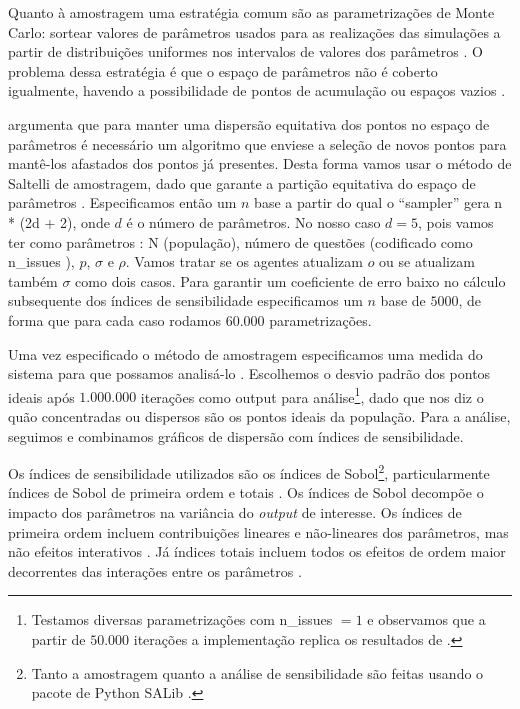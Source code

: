 Quanto à amostragem uma estratégia comum são as parametrizações de Monte Carlo:
sortear valores de parâmetros usados para as realizações das simulações a partir
de distribuições uniformes nos intervalos de valores dos parâmetros
\cite{laver2011party}. O problema dessa estratégia é que o espaço de parâmetros
não é coberto igualmente, havendo a possibilidade de pontos de acumulação ou
espaços vazios \cite{pereda2017brief}.

 argumenta que para manter uma dispersão equitativa
dos pontos no espaço de parâmetros é necessário um algoritmo que enviese a
seleção de novos pontos para mantê-los afastados dos pontos já presentes. Desta
forma vamos usar o método de Saltelli de amostragem, dado que garante a partição
equitativa do espaço de parâmetros \cite{herman2017salib}. Especificamos então
um \(n\) base a partir do qual o ``sampler'' gera n * (2d + 2), onde \(d\) é o
número de parâmetros. No nosso caso \(d = 5\), pois vamos ter como parâmetros :
N (população), número de questões (codificado como n\_issues ), \(p\), \(\sigma\) e
\(\rho\). Vamos tratar se os agentes atualizam \(o\) ou se atualizam também \(\sigma\)
como dois casos. Para garantir um coeficiente de erro baixo no cálculo
subsequente dos índices de sensibilidade especificamos um \(n\) base de
\(5000\), de forma que para cada caso rodamos \(60.000\) parametrizações.

Uma vez especificado o método de amostragem especificamos uma medida do sistema
para que possamos analisá-lo \cite{railsback2012agent}. Escolhemos o desvio
padrão dos pontos ideais após \(1.000.000\) iterações como output para
análise\footnote{Testamos diversas parametrizações com n\_issues \(= 1\) e
  observamos que a partir de \(50.000\) iterações a implementação replica os
  resultados de .}, dado que nos diz o quão
concentradas ou dispersos são os pontos ideais da população. Para a análise,
seguimos \cite{ten2016sensitivity} e combinamos gráficos de dispersão com
índices de sensibilidade. 

Os índices de sensibilidade utilizados são os índices de Sobol\footnote{Tanto a
  amostragem quanto a análise de sensibilidade são feitas usando o pacote de
  Python SALib \cite{herman2017salib}.}, particularmente índices de Sobol de
primeira ordem e totais \cite{saltelli2008global}. Os índices de Sobol decompõe
o impacto dos parâmetros na variância do \textit{output} de interesse. Os
índices de primeira ordem incluem contribuições lineares e não-lineares dos
parâmetros, mas não efeitos interativos \cite{ten2016sensitivity}. Já índices
totais incluem todos os efeitos de ordem maior decorrentes das interações entre
os parâmetros \cite{saltelli2008global}.



